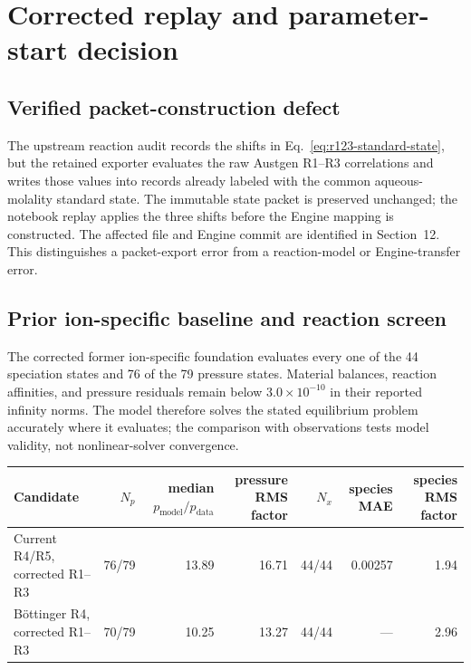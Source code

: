 \documentclass[10pt,oneside]{scrartcl}
\begin{document}
\section{Corrected replay and parameter-start decision}
\label{sec:start-decision}
\begingroup
\small
\linespread{1.05}\selectfont

\subsection{Verified packet-construction defect}

The upstream reaction audit records the shifts in
Eq.~\eqref{eq:r123-standard-state}, but the retained exporter evaluates the raw
Austgen R1--R3 correlations and writes those values into records already
labeled with the common aqueous-molality standard state. The immutable state
packet is preserved unchanged; the notebook replay applies the three shifts
before the Engine mapping is constructed. The affected file and Engine commit
are identified in Section~12. This distinguishes a packet-export error from a
reaction-model or Engine-transfer error.

\subsection{Prior ion-specific baseline and reaction screen}

The corrected former ion-specific foundation evaluates every one of the 44 speciation
states and 76 of the 79 pressure states. Material balances, reaction
affinities, and pressure residuals remain below $3.0\times10^{-10}$ in their
reported infinity norms. The model therefore solves the stated equilibrium
problem accurately where it evaluates; the comparison with observations tests
model validity, not nonlinear-solver convergence.

\begin{center}
\footnotesize
\begin{tabularx}{\textwidth}{@{}Yrrrrrr@{}}
\toprule
Candidate & $N_p$ & median $p_{\mathrm{model}}/p_{\mathrm{data}}$ & pressure RMS factor & $N_x$ & species MAE & species RMS factor \\
\midrule
Current R4/R5, corrected R1--R3 & 76/79 & 13.89 & 16.71 & 44/44 & 0.00257 & 1.94 \\
B\"ottinger R4, corrected R1--R3 & 70/79 & 10.25 & 13.27 & 44/44 & --- & 2.96 \\
\bottomrule
\end{tabularx}
\end{center}
\end{document}
